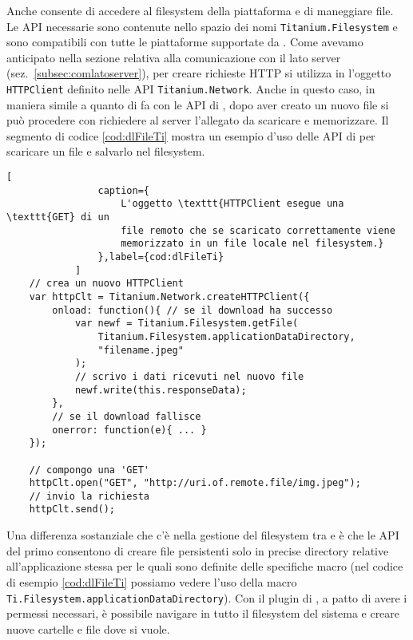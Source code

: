 			Anche \tisdk{} consente di accedere al filesystem della piattaforma 
			e di maneggiare file. Le API necessarie sono contenute nello 
			spazio dei nomi \texttt{Titanium.Filesystem} e sono compatibili 
			con tutte le piattaforme supportate da \tisdk{}. Come avevamo 
			anticipato nella sezione relativa alla comunicazione con il lato 
			server (sez.~\ref{subsec:comlatoserver}), per creare richieste HTTP 
			si utilizza in \tisdk{} l'oggetto \texttt{HTTPClient} definito nelle 
			API \texttt{Titanium.Network}. Anche in questo caso, in maniera 
			simile a quanto di fa con le API di \pg{}, dopo aver creato un nuovo 
			file si può procedere con richiedere al server l'allegato da 
			scaricare e memorizzare. Il segmento di codice \ref{cod:dlFileTi} 
			mostra un esempio d'uso delle API di \tisdk{} per scaricare un file 
			e salvarlo nel filesystem.
			\begin{lstlisting}[
				caption={
					L'oggetto \texttt{HTTPClient esegue una \texttt{GET} di un 
					file remoto che se scaricato correttamente viene 
					memorizzato in un file locale nel filesystem.}
				},label={cod:dlFileTi}
			]
	// crea un nuovo HTTPClient
	var httpClt = Titanium.Network.createHTTPClient({
		onload: function(){ // se il download ha successo
			var newf = Titanium.Filesystem.getFile(
				Titanium.Filesystem.applicationDataDirectory,
				"filename.jpeg"
			);
			// scrivo i dati ricevuti nel nuovo file
			newf.write(this.responseData);
		},
		// se il download fallisce
		onerror: function(e){ ... }
	});
	
	// compongo una 'GET'
	httpClt.open("GET", "http://uri.of.remote.file/img.jpeg");
	// invio la richiesta
	httpClt.send();
			\end{lstlisting}
			Una differenza sostanziale che c'è nella gestione del filesystem 
			tra \tisdk{} e \pg{} è che le API del primo consentono di creare 
			file persistenti solo in precise directory relative 
			all'applicazione stessa per le quali sono definite delle specifiche 
			macro (nel codice di esempio \ref{cod:dlFileTi} possiamo vedere 
			l'uso della macro \texttt{Ti.Filesystem.applicationDataDirectory}). 
			Con il plugin di \pg{}, a patto di avere i permessi necessari, è 
			possibile navigare in tutto il filesystem del sistema e creare nuove 
			cartelle e file dove si vuole.
		
